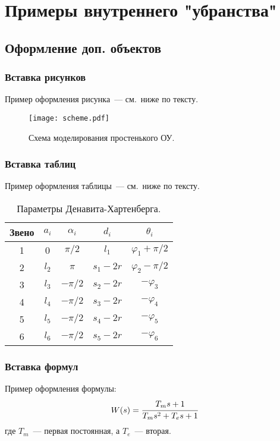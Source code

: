 \section{Примеры внутреннего "убранства"}\label{part_example_of_doc_inside}
\subsection{Оформление доп. объектов}\label{part_pasting_of_extra_objects}
\subsubsection{Вставка рисунков}\label{part_pasting_of_figures}
Пример оформления рисунка~--- см.~ниже по тексту.

\begin{figure}[h]
	\centering
	\texttt{[image: scheme.pdf]}
	\caption{Схема моделирования простенького ОУ.}
	\label{figure_just_example}
\end{figure}


\subsubsection{Вставка таблиц}\label{part_pasting_of_tables}
Пример оформления таблицы~--- см.~ниже по тексту.

\begin{table}[h]
	\caption{Параметры Денавита-Хартенберга.}
	\begin{tabular}{|c|c|c|c|c|}
		\hline
		Звено & $a_i$ & $\alpha_i$ & $d_i$ & $\theta_i$\\
		\hline
		1 & 0 & $\pi/2$ & $l_1$ & $\varphi_1+\pi/2$\\
		\hline
		2  & $l_2$ & $\pi$ & $s_1-2r$ & $\varphi_2-\pi/2$\\
		\hline	
		3 & $l_3$ & $-\pi/2$ & $s_2-2r$ & $-\varphi_3$\\
		\hline
		4 & $l_4$ & $-\pi/2$ & $s_3-2r$ & $-\varphi_4$\\
		\hline
		5 & $l_5$ & $-\pi/2$ & $s_4-2r$ & $-\varphi_5$\\
		\hline
		6 & $l_6$ & $-\pi/2$ & $s_5-2r$ & $-\varphi_6$\\
		\hline
	\end{tabular}
	\label{table_DH_params}
\end{table}


\subsubsection{Вставка формул}\label{part_pasting_of_formulas}
Пример оформления формулы:
\begin{equation}\label{eq_example_of_formula}
	W(s) = \cfrac{T_ms+1}{T_ms^2+T_es+1}
\end{equation}
где $T_m$~--- первая постоянная, а $T_e$~--- вторая.

